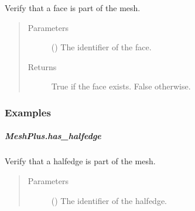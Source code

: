\documentclass[letterpaper,10pt,english]{sphinxmanual}
\begin{document}
\begin{fulllineitems}
\begin{fulllineitems}
\label{\detokenize{api/generated/directional_clustering.mesh.MeshPlus.has_face:directional_clustering.mesh.MeshPlus.has_face}}
Verify that a face is part of the mesh.
\begin{quote}\begin{description}
\item[{Parameters}] \leavevmode
{} () \textendash{} The identifier of the face.

\item[{Returns}] \leavevmode
{} \textendash{} True if the face exists.
False otherwise.

\end{description}\end{quote}
\subsubsection*{Examples}

\begin{sphinxVerbatim}[commandchars=\\\{\}]
\end{sphinxVerbatim}

\end{fulllineitems}



\subparagraph{MeshPlus.has\_halfedge}
\label{\detokenize{api/generated/directional_clustering.mesh.MeshPlus.has_halfedge:meshplus-has-halfedge}}\label{\detokenize{api/generated/directional_clustering.mesh.MeshPlus.has_halfedge::doc}}

\begin{fulllineitems}
\label{\detokenize{api/generated/directional_clustering.mesh.MeshPlus.has_halfedge:directional_clustering.mesh.MeshPlus.has_halfedge}}
Verify that a halfedge is part of the mesh.
\begin{quote}\begin{description}
\item[{Parameters}] \leavevmode
{} () \textendash{} The identifier of the halfedge.


\end{description}
\end{quote}
\end{fulllineitems}
\end{fulllineitems}
\end{document}
